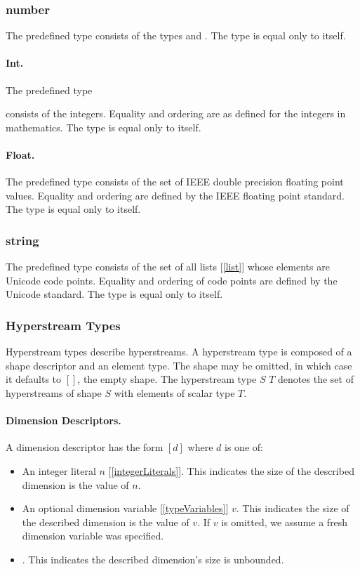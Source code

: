 \documentclass{article}
\begin{document}
{\subsubsection{number}
\label{number}

 The predefined type \NUMBER{} consists of the types \INT{} and \FLOAT. The type \NUMBER{} is equal only to itself. 
 
 \paragraph{Int.} The predefined type \INT} consists of the integers. Equality and ordering are as defined for the integers in mathematics. The type \INT{} is equal only to itself.

 \paragraph{Float.} The predefined type \FLOAT{} consists of the set of IEEE double precision floating point values.  Equality and ordering are defined by the IEEE floating point standard.  The type \FLOAT{} is equal only to itself.
 

 
\subsubsection{string}
\label{string}

The predefined type \STRING{} consists of the set of all lists [\ref{list}] whose elements are Unicode code points. Equality and ordering of code points are defined by the Unicode standard. The type \STRING{} is equal only to itself. 

\subsubsection{Hyperstream Types}
\label{hyperstreamTypes}

Hyperstream types describe hyperstreams. A hyperstream type is composed of a shape descriptor and an element type. The shape may be omitted, in which case it defaults to $[]$, the empty shape. The hyperstream type $S$ $T$ denotes the set of hyperstreams of shape $S$ with elements of scalar type $T$.

\paragraph{Dimension Descriptors.}
A dimension descriptor has the form $[d]$ where $d$ is one of:
\begin{itemize}
\item An integer literal $n$ [\ref{integerLiterals}]. This indicates the size of the described dimension is the value of $n$.
\item An optional dimension variable [\ref{typeVariables}] $v$. This indicates the size of the described dimension is the value of $v$.
If $v$ is omitted, we assume a fresh dimension variable was specified.
\item  \QUESTIONMARK. This indicates the described dimension's size is unbounded.
 \end{itemize}
 
\end{document}

